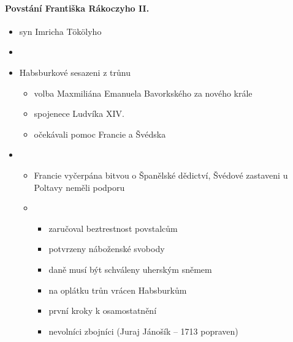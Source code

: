 \paragraph{Povstání Františka Rákoczyho II.}
\begin{itemize}
\item syn Imricha Tökölyho
\item {}
\item Habsburkové sesazeni z trůnu
	\begin{itemize}
	\item volba Maxmiliána Emanuela Bavorkského za nového krále
	\item spojenece Ludvíka XIV.
	\item očekávali pomoc Francie a Švédska
	\end{itemize}
\item {}
	\begin{itemize}
	\item Francie vyčerpána bitvou o Španělské dědictví, Švédové zastaveni u Poltavy \ra neměli podporu
	\item {}
		\begin{itemize}
		\item zaručoval beztrestnost povstalcům
		\item potvrzeny náboženské svobody
		\item daně musí být schváleny uherským sněmem
		\item na oplátku trůn vrácen Habsburkům
		\item první kroky k osamostatnění
		\item nevolníci \ra zbojníci (Juraj Jánošík -- 1713 popraven)
		\end{itemize}
	\end{itemize}
\end{itemize}

\timeline

